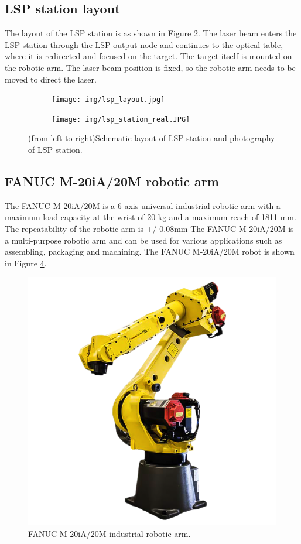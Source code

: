 \subsection{LSP station layout}

The layout of the LSP station is as shown in Figure \ref{fig:lsplayout}. The laser
beam enters the LSP station through the LSP output node and
continues to the optical table, where it is redirected and
focused on the target. The target itself is mounted on the
robotic arm. The laser beam position is fixed, so the robotic
arm needs to be moved to direct the laser.

\begin{figure}[t!]
\centering
\begin{subfigure}{.45\textwidth}

    \texttt{[image: img/lsp\_layout.jpg]}

    \label{fig:lsplayout}
\end{subfigure}
\begin{subfigure}{.45\textwidth}

    \texttt{[image: img/lsp\_station\_real.JPG]}

    \label{fig:lsplayout}
\end{subfigure}

\caption{(from left to right)Schematic layout of LSP station and photography of LSP station.}
\label{fig:test}
\end{figure}

\subsection{FANUC M-20iA/20M robotic arm}

The FANUC M-20iA/20M is a 6-axis universal industrial robotic arm with a maximum load capacity at the wrist of 20 kg and a maximum reach of 1811 mm. The repeatability of the robotic arm is +/-0.08mm The FANUC M-20iA/20M is a multi-purpose robotic arm and can be used for various applications such as assembling, packaging and machining. The  FANUC M-20iA/20M robot is shown in Figure \ref{fig:fanucrobot}.

\begin{figure}[h]
    \centering
    \includegraphics[width=0.6\linewidth]{img/fanuc_robot.png}
    \caption{FANUC M-20iA/20M industrial robotic arm.}
    \label{fig:fanucrobot}
\end{figure}


